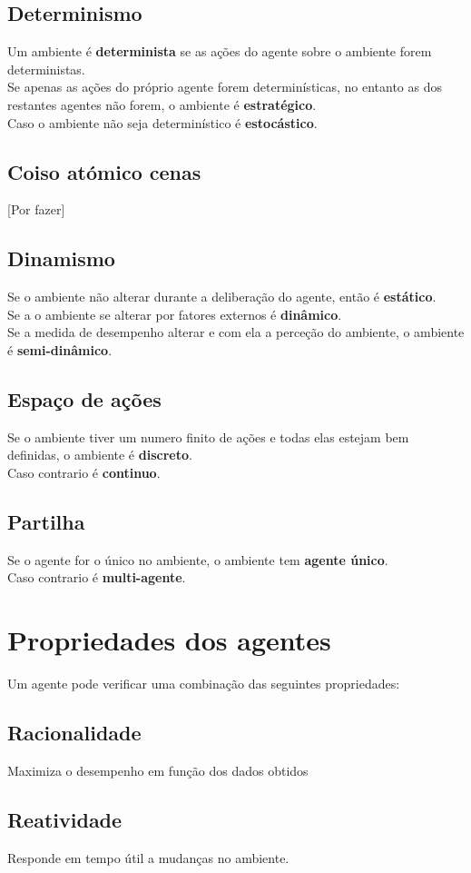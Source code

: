 \documentclass[]{report}
\begin{document}
\subsection{Determinismo}
Um ambiente é \textbf{determinista} se as ações do agente sobre o ambiente forem deterministas.\\
Se apenas as ações do próprio agente forem determinísticas, no entanto as dos restantes agentes não forem, o ambiente é \textbf{estratégico}.\\
Caso o ambiente não seja determinístico é \textbf{estocástico}.
\subsection{Coiso atómico cenas}
[Por fazer]
\subsection{Dinamismo}
Se o ambiente não alterar durante a deliberação do agente, então é \textbf{estático}.\\
Se a o ambiente se alterar por fatores externos é \textbf{dinâmico}.\\
Se a medida de desempenho alterar e com ela a perceção do ambiente, o ambiente é \textbf{semi-dinâmico}.
\subsection{Espaço de ações}
Se o ambiente tiver um numero finito de ações e todas elas estejam bem definidas, o ambiente é \textbf{discreto}.\\
Caso contrario é \textbf{continuo}.
\subsection{Partilha}
Se o agente for o único no ambiente, o ambiente tem \textbf{agente único}.\\
Caso contrario é \textbf{multi-agente}.
\clearpage
\section{Propriedades dos agentes}
Um agente pode verificar uma combinação das seguintes propriedades:
\subsection{Racionalidade}
Maximiza o desempenho em função dos dados obtidos
\subsection{Reatividade}
Responde em tempo útil a mudanças no ambiente.
\end{document}
